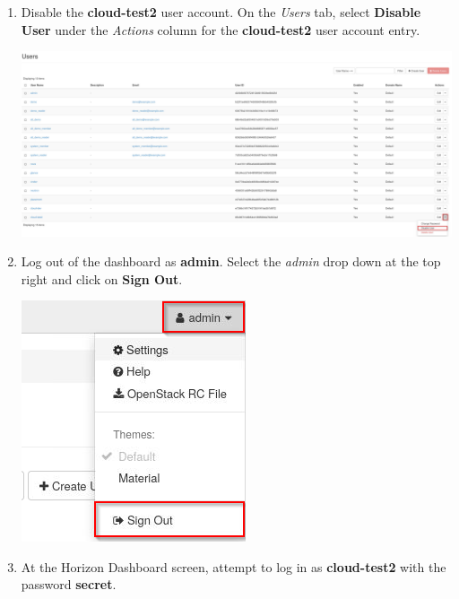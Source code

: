 \documentclass[letterpaper, 12pt]{article}
\begin{document}
\begin{enumerate}
    \item Disable the \textbf{cloud-test2} user account. On the \textit{Users} tab, select \textbf{Disable User} under
    the \textit{Actions} column for the \textbf{cloud-test2} user account entry.

    \begin{center}
        \includegraphics[width=\linewidth]{images/part3/step7.png}
    \end{center}

    \item Log out of the dashboard as \textbf{admin}. Select the \textit{admin} drop down at the top right and click on
    \textbf{Sign Out}.

    \begin{center}
        \includegraphics[scale=0.75]{images/part3/step8.png}
    \end{center}

    \item At the Horizon Dashboard screen, attempt to log in as \textbf{cloud-test2} with the password \textbf{secret}.
    

\end{enumerate}
\end{document}

